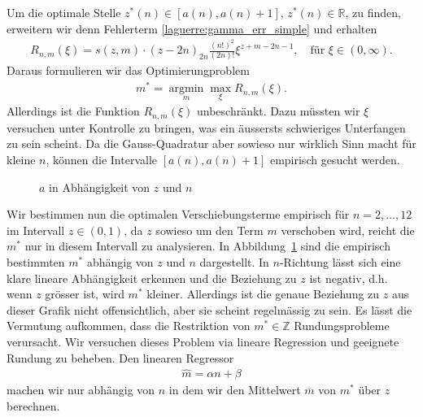 Um die optimale Stelle $z^*(n) \in \left[a(n), a(n) + 1\right]$,
$z^*(n) \in \mathbb{R}$,
zu finden,
erweitern wir denn Fehlerterm \eqref{laguerre:gamma_err_simple}
und erhalten
\begin{align}
R_{n,m}(\xi)
=
s(z, m) \cdot (z - 2n)_{2n} \frac{(n!)^2}{(2n)!} \xi^{z + m - 2n - 1}
,\quad
\text{für }
\xi \in (0, \infty)
.
\label{laguerre:gamma_err_shifted}
\end{align}
%
%
Daraus formulieren wir das Optimierungproblem
\begin{align*}
m^*
=
\operatorname*{argmin}_m \max_\xi R_{n,m}(\xi)
.
\end{align*}
Allerdings ist die Funktion $R_{n,m}(\xi)$ unbeschränkt.
Dazu müssten wir $\xi$ versuchen unter Kontrolle zu bringen,
was ein äussersts schwieriges Unterfangen zu sein scheint.
Da die Gauss-Quadratur aber sowieso nur wirklich Sinn macht für kleine $n$,
können die Intervalle $[a(n), a(n)+1]$ empirisch gesucht werden.

\begin{figure}
\centering

\vspace{-12pt}
\caption{$a$ in Abhängigkeit von $z$ und $n$}
\label{laguerre:fig:targets}
\end{figure}

Wir bestimmen nun die optimalen Verschiebungsterme empirisch
für $n = 2,\ldots, 12$ im Intervall $z \in (0, 1)$,
da $z$ sowieso um den Term $m$ verschoben wird,
reicht die $m^*$ nur in diesem Intervall zu analysieren.
In Abbildung~\ref{laguerre:fig:targets} sind die empirisch bestimmten $m^*$
abhängig von $z$ und $n$ dargestellt.
In $n$-Richtung lässt sich eine klare lineare Abhängigkeit erkennen und
die Beziehung zu $z$ ist negativ,
d.h. wenn $z$ grösser ist, wird $m^*$ kleiner.
Allerdings ist die genaue Beziehung zu $z$
aus dieser Grafik nicht offensichtlich,
aber sie scheint regelmässig zu sein.
Es lässt die Vermutung aufkommen,
dass die Restriktion von $m^* \in \mathbb{Z}$ Rundungsprobleme verursacht.
Wir versuchen dieses Problem via lineare Regression und
geeignete Rundung zu beheben.
Den linearen Regressor
\begin{align*}
\hat{m}
=
\alpha n + \beta
\end{align*}
machen wir nur abhängig von $n$
in dem wir den Mittelwert $\overline{m}$ von $m^*$ über $z$ berechnen.

